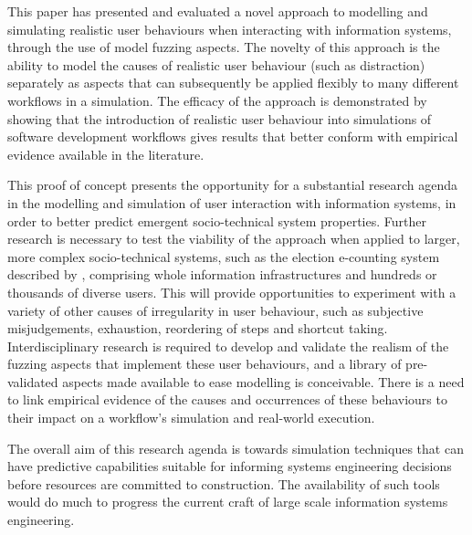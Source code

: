 \documentclass{llncs}
\begin{document}
This paper has presented and evaluated a novel approach to modelling and simulating realistic user behaviours when
interacting with information systems, through the use of model fuzzing aspects.  The novelty of this approach is the
ability to model the causes of realistic user behaviour (such as distraction) separately as aspects that can
subsequently be applied flexibly to many different workflows in a simulation. The efficacy of the approach is
demonstrated by showing that the introduction of realistic user behaviour into simulations of software development
workflows gives results that better conform with empirical evidence available in the literature.

This proof of concept presents the opportunity for a substantial research agenda in the modelling and simulation of user
interaction with information systems, in order to better predict emergent socio-technical system properties. Further
research is necessary to test the viability of the approach when applied to larger, more complex socio-technical
systems, such as the election e-counting system described by \citet{lock07observations}, comprising whole information
infrastructures and hundreds or thousands of diverse users.  This will provide opportunities to experiment with a
variety of other causes of irregularity in user behaviour, such as subjective misjudgements, exhaustion, reordering of
steps and shortcut taking.  Interdisciplinary research is required to develop and validate the realism of the fuzzing
aspects that implement these user behaviours, and a library of pre-validated aspects made available to ease modelling is
conceivable. There is a need to link empirical evidence of the causes and occurrences of these behaviours to their
impact on a workflow's simulation and real-world execution.

The overall aim of this research agenda is towards simulation techniques that can have predictive capabilities suitable
for informing systems engineering decisions before resources are committed to construction.  The availability of such
tools would do much to progress the current craft of large scale information systems engineering.







\end{document}
